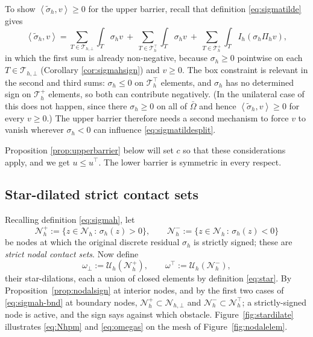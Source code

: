 \documentclass[12pt]{amsart}
\numberwithin{equation}{section}
\theoremstyle{plain}
\theoremstyle{definition}
\theoremstyle{remark}
\newcommand{\Om}{\Omega}
\newcommand{\Th}{\mathcal{T}_h}
\newcommand{\Nh}{\mathcal{N}_h}
\newcommand{\Ih}{I_h}
\newcommand{\Pih}{\Pi_h}
\newcommand{\Uh}{\mathcal{U}_h}
\newcommand{\Thbot}{\mathcal{T}_{h,\bot}}
\newcommand{\Thtop}{\Th^\top}
\newcommand{\Thplus}{\Th^+}
\newcommand{\Nhbot}{\mathcal{N}_{h,\bot}}
\newcommand{\Nhtop}{\Nh^\top}
\newcommand{\ombot}{\omega_\bot}
\newcommand{\omtop}{\omega^\top}
\begin{document}
To show $\left<\tilde\sigma_h,v\right> \ge 0$ for the upper barrier, recall that definition \eqref{eq:sigmatilde} gives
\begin{equation}
\label{eq:sigmatildesplit}
  \left<\tilde\sigma_h,v\right> = \sum_{T\in\Thbot}\int_T \sigma_h v \ +\ \sum_{T\in\Thtop}\int_T \sigma_h v \ +\ \sum_{T\in\Thplus}\int_T \Ih(\sigma_h \Pih v),
\end{equation}
in which the first sum is already non-negative, because $\sigma_h \ge 0$ pointwise on each $T \in \Thbot$ (Corollary \ref{cor:sigmahsign}) and $v \ge 0$.  The box constraint is relevant in the second and third sums: $\sigma_h \le 0$ on $\Thtop$ elements, and $\sigma_h$ has no determined sign on $\Thplus$ elements, so both can contribute negatively.  (In the unilateral case of \cite{NSV03} this does not happen, since there $\sigma_h \ge 0$ on all of $\bar\Om$ and hence $\left<\tilde\sigma_h,v\right> \ge 0$ for every $v \ge 0$.)  The upper barrier therefore needs a second mechanism to force $v$ to vanish wherever $\sigma_h < 0$ can influence \eqref{eq:sigmatildesplit}.

Proposition \ref{prop:upperbarrier} below will set $c$ so that these considerations apply, and we get $u\le u^\top$.  The lower barrier is symmetric in every respect.

\subsection{Star-dilated strict contact sets}  \label{subsec:stardilate}  Recalling definition \eqref{eq:sigmah}, let
\begin{equation}
\label{eq:Nhpm}
  \Nh^+ := \{z \in \Nh \,:\, \sigma_h(z) > 0\}, \qquad
  \Nh^- := \{z \in \Nh \,:\, \sigma_h(z) < 0\}
\end{equation}
be nodes at which the original discrete residual $\sigma_h$ is strictly signed; these are \emph{strict nodal contact sets}.  Now define
\begin{equation}
\label{eq:omegas}
  \ombot := \Uh(\Nh^+), \qquad \omtop := \Uh(\Nh^-),
\end{equation}
their star-dilations, each a union of closed elements by definition \eqref{eq:star}.  By Proposition~\ref{prop:nodalsign} at interior nodes, and by the first two cases of \eqref{eq:sigmah-bnd} at boundary nodes, $\Nh^+ \subset \Nhbot$ and $\Nh^- \subset \Nhtop$; a strictly-signed node is active, and the sign says against which obstacle.  Figure~\ref{fig:stardilate} illustrates \eqref{eq:Nhpm} and \eqref{eq:omegas} on the mesh of Figure~\ref{fig:nodalelem}.
\end{document}
